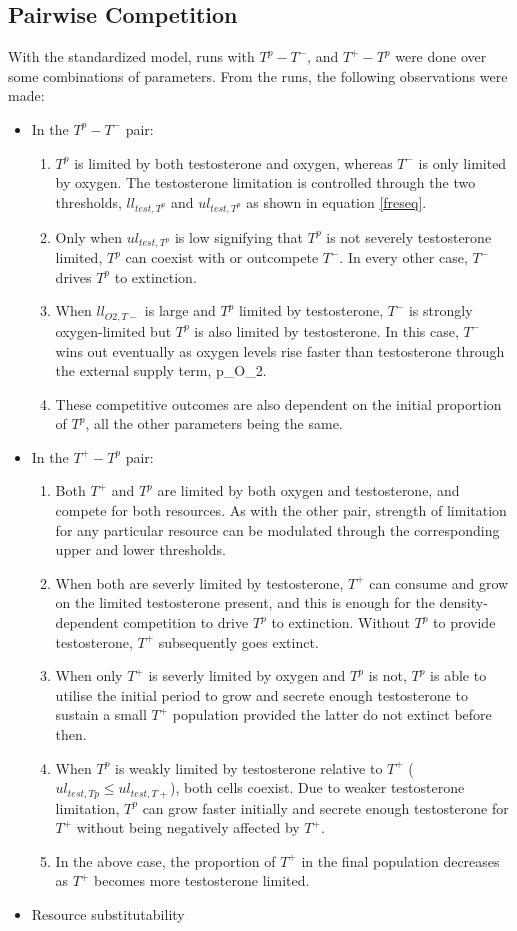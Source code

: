 \documentclass[11pt,a4paper]{article}
\begin{document}
\subsection{Pairwise Competition}
With the standardized model, runs with $T^p - T^-$, and $T^+ - T^p$ were done over some combinations of parameters. From the runs, the following observations were made:
\begin{itemize}
  \item In the $T^p - T^-$ pair:
  \begin{enumerate}
    \item $T^p$ is limited by both testosterone and oxygen, whereas $T^-$ is only limited by oxygen. The testosterone limitation is controlled through the two thresholds, $ll_{test,T^p}$ and $ul_{test,T^p}$ as shown in equation \ref{freseq}.
    \item Only when $ul_{test,T^p}$ is low signifying that $T^p$ is not severely testosterone limited, $T^p$ can coexist with or outcompete $T^-$. In every other case, $T^-$ drives $T^p$ to extinction.
    \item  When $ll_{O2,T-}$ is large and $T^p$ limited by testosterone, $T^-$ is strongly oxygen-limited but $T^p$ is also limited by testosterone. In this case, $T^-$ wins out eventually as oxygen levels rise faster than testosterone through the external supply term, p_{O_2}.
    \item These competitive outcomes are also dependent on the initial proportion of $T^p$, all the other parameters being the same.
  \end{enumerate}
  \item In the $T^+ - T^p$ pair:
  \begin{enumerate}
    \item Both $T^+$ and $T^p$ are limited by both oxygen and testosterone, and compete for both resources. As with the other pair, strength of limitation for any particular resource can be modulated through the corresponding upper and lower thresholds.
    \item When both are severly limited by testosterone, $T^+$ can consume and grow on the limited testosterone present, and this is enough for the density-dependent competition to drive $T^p$ to extinction. Without $T^p$ to provide testosterone, $T^+$ subsequently goes extinct.
    \item When only $T^+$ is severly limited by oxygen and $T^p$ is not, $T^p$ is able to utilise the initial period to grow and secrete enough testosterone to sustain a small $T^+$ population provided the latter do not extinct before then.
    \item When $T^p$ is weakly limited by testosterone relative to $T^+$ ($ul_{test,Tp} \leq ul_{test,T+}$), both cells coexist. Due to weaker testosterone limitation, $T^p$ can grow faster initially and secrete enough testosterone for $T^+$ without being negatively affected by $T^+$.
    \item In the above case, the proportion of $T^+$ in the final population decreases as $T^+$ becomes more testosterone limited.
  \end{enumerate}
  \item Resource substitutability
  

\end{itemize}
\end{document}
